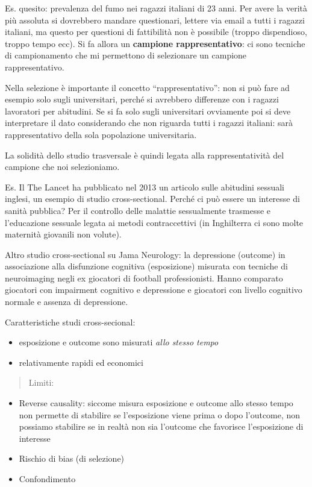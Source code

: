 Es. quesito: prevalenza del fumo nei ragazzi italiani di 23 anni. Per
avere la verità più assoluta si dovrebbero mandare questionari, lettere
via email a tutti i ragazzi italiani, ma questo per questioni di
fattibilità non è possibile (troppo dispendioso, troppo tempo ecc). Si
fa allora un \textbf{campione rappresentativo}: ci sono tecniche di
campionamento che mi permettono di selezionare un campione
rappresentativo.

Nella selezione è importante il concetto ``rappresentativo'': non si può
fare ad esempio solo sugli universitari, perché si avrebbero differenze
con i ragazzi lavoratori per abitudini. Se si fa solo sugli universitari
ovviamente poi si deve interpretare il dato considerando che non
riguarda tutti i ragazzi italiani: sarà rappresentativo della sola
popolazione universitaria.

La solidità dello studio trasversale è quindi legata alla
rappresentatività del campione che noi selezioniamo.

Es. Il The Lancet ha pubblicato nel 2013 un articolo sulle abitudini
sessuali inglesi, un esempio di studio cross-sectional. Perché ci può
essere un interesse di sanità pubblica? Per il controllo delle malattie
sessualmente trasmesse e l'educazione sessuale legata ai metodi
contraccettivi (in Inghilterra ci sono molte maternità giovanili non
volute).

Altro studio cross-sectional su Jama Neurology: la depressione (outcome)
in associazione alla disfunzione cognitiva (esposizione) misurata con
tecniche di neuroimaging negli ex giocatori di football professionisti.
Hanno comparato giocatori con impairment cognitivo e depressione e
giocatori con livello cognitivo normale e assenza di depressione.

Caratteristiche studi cross-secional:

\begin{itemize}
\item
  esposizione e outcome sono misurati \emph{allo stesso tempo}
\item
  relativamente rapidi ed economici
\end{itemize}

\begin{quote}
Limiti:
\end{quote}

\begin{itemize}
\item
  Reverse causality: siccome misura esposizione e outcome allo stesso
  tempo non permette di stabilire se l'esposizione viene prima o dopo
  l'outcome, non possiamo stabilire se in realtà non sia l'outcome che
  favorisce l'esposizione di interesse
\item
  Rischio di bias (di selezione)
\item
  Confondimento
\end{itemize}

